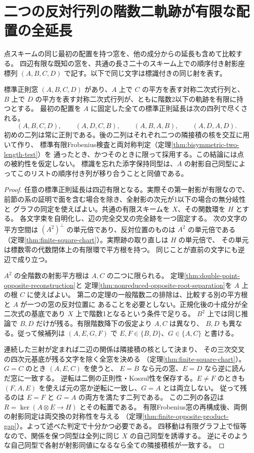 \section{二つの反対行列の階数二軌跡が有限な配置の全延長}
\label{sec:clean-configuration-extensions}
点スキームの同じ最初の配置を持つ窓を、他の成分からの延長も含めて比較する。
四辺有限な既知の窓を、共通の長さ二十のスキーム上での順序付き射影座標列
$(A,B,C,D)$ で記す。以下で同じ文字は標識付きの同じ射を表す。
\begin{theorem}\label{thm:clean-configuration-extensions}
標準正則窓 $(A,B,C,D)$ があり、$A$ 上で $C$ の平方を表す対称二次式行列と、
$B$ 上で $D$ の平方を表す対称二次式行列が、ともに階数2以下の軌跡を有限に持つとする。
最初の配置を $A$ に固定した全ての標準正則延長は次の四列で尽くされる。
\[
 (A,B,C,D),\qquad(A,D,C,B),\qquad
 (A,B,A,B),\qquad(A,D,A,D).
\]
初めの二列は常に正則である。後の二列はそれぞれ二つの隣接積の核を交互に用いて作り、
標準有限Frobenius検査と両対称判定（定理\ref{thm:bisymmetric-two-length-test}）を
通ったとき、かつそのときに限って採用する。この結論には点の被約性を仮定しない。
標識を忘れた添字保持同型は、$A$ の射影自己同型によってこのリストの順序付き列が移り合うことと同値である。
\end{theorem}
\begin{proof}
任意の標準正則延長は四辺有限となる。実際その第一射影が有限なので、
前節の系の証明で面を含む場合を除き、全射影の次元が1以下の場合の無分岐性と
グラフの同定を使えばよい。共通の有限スキームを $X$、その関数環を $H$ とする。
各文字束を自明化し、辺の完全交叉の完全跡を一つ固定する。
次の文字の平方空間は $(A^2)^\perp$ の単元倍であり、反対位置のものは $A^2$ の単元倍である
（定理\ref{thm:finite-square-chart}）。実際跡の取り直しは $H$ の単元倍で、
その単元は標数零の代数閉体上の有限環で平方根を持つ。
同じことが直前の文字にも逆辺で成り立つ。

$A^2$ の全階数の射影平方根は $A,C$ の二つに限られる。
定理\ref{thm:double-point-opposite-reconstruction}と
定理\ref{thm:nonreduced-opposite-root-separation}を $A$ 上の根 $C$ に使えばよい。
第二の定理の一般階数二の排除は、比較する別の平方根と $A$ が一つの窓の反対位置に
あることを必要としない。正規化後の十成分が全二次式の基底であり $X$ 上で階数1となるという条件で足りる。
$B^2$ 上では同じ推論で $B,D$ だけが残る。有限階数降下の仮定より $A,C$ は異なり、
$B,D$ も異なる。従って候補列は $(A,E,G,F)$ で
$E,F\in\{B,D\}$、$G\in\{A,C\}$ と書ける。

連続した三射が定まれば二辺の関係は隣接積の核として決まり、
その三次交叉の四次元基底が残る文字を除く全窓を決める
（定理\ref{thm:finite-square-chart}）。$G=C$ のとき $(A,E,C)$ を使うと、
$E=B$ なら元の窓、$E=D$ なら逆に読んだ窓に一致する。
逆転は二側の正則性・Koszul性を保存する。$E\ne F$ のときも
$(F,A,E)$ を使えば元の窓か逆転に一致し、$G=A$ とは両立しない。
従って残るのは $E=F$ と $G=A$ の両方を満たす二列である。
この二列の各辺は $R=\ker(A\otimes E\to H)$ とその転置である。
有限Frobenius窓の再構成後、両側の射影同定は両交換の対称性を与える
（定理\ref{thm:finite-opposite-product-gap}）。よって述べた判定で十分かつ必要である。
四移動は有限グラフ上で恒等なので、関係を保つ同型は全列に同じ $X$ の自己同型を誘導する。
逆にそのような自己同型で各射が射影同値になるなら全ての隣接積核が一致する。
\end{proof}

